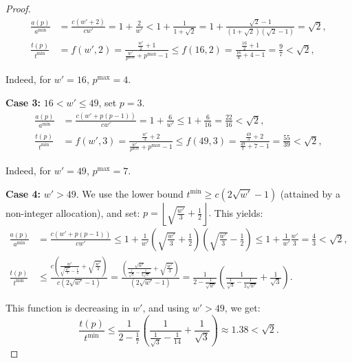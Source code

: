 \documentclass{article}
\begin{document}
\begin{proof}
\begin{align*}
\frac{a(p)}{a^{\min}} &=\frac{c(w'+2)}{cw'}=1+\frac{2}{w'} < 1+\frac{1}{1+\sqrt{2}}=1+\frac{\sqrt{2}-1}{(1+\sqrt{2})(\sqrt{2}-1)}=\sqrt{2}, \\[6pt]
\frac{t(p)}{t^{\min}}
      &= f(w',2)
       = \frac{\tfrac{w'}{2} + 1}{\tfrac{w'}{p^{\max}} + p^{\max} - 1}
       \le f(16,2)
       = \frac{\tfrac{16}{2} + 1}{\tfrac{16}{4} + 4 - 1}
       = \frac{9}{7}
       < \sqrt{2},
\end{align*}

Indeed, for \(w' = 16\), \(p^{\max}=4\).

\textbf{Case 3:} \(16 < w' \le 49\), set \(p = 3\).
\begin{align*}
\frac{a(p)}{a^{\min}}
      &= \frac{c\!\left(w' + p(p-1)\right)}{c w'}
       = 1 + \frac{6}{w'}
       \le 1 + \frac{6}{16}
       = \frac{22}{16}
       < \sqrt{2}, \\[6pt]
\frac{t(p)}{t^{\min}}
      &= f(w',3)
       = \frac{\tfrac{w'}{3} + 2}{\tfrac{w'}{p^{\max}} + p^{\max} - 1}
       \le f(49,3)
       = \frac{\tfrac{49}{3} + 2}{\tfrac{49}{7} + 7 - 1}
       = \frac{55}{39}
       < \sqrt{2},
\end{align*}

Indeed, for \(w' = 49\), \(p^{\max}=7\).


\textbf{Case 4:} \(w' > 49\).  
We use the lower bound \(t^{\min} \ge c(2\sqrt{w'} - 1)\) (attained by a non-integer allocation), and set:
\(
p = \left\lfloor \sqrt{\frac{w'}{3}} + \frac{1}{2} \right\rfloor.
\)
This yields:
\begin{align*}
\frac{a(p)}{a^{\min}}&=\frac{c(w'+p(p-1))}{cw'}\leq 1+\frac{1}{w'}\left( \sqrt{\frac{w'}{3}}+\frac{1}{2}\right)\left(\sqrt{\frac{w'}{3}}-\frac{1}{2}\right)\leq 1+\frac{1}{w'}\frac{w'}{3} = \frac{4}{3}<\sqrt{2}, \\[6pt]
\frac{t(p)}{t^{\min}} &\leq \frac{c\left(\frac{w'}{\sqrt{\frac{w'}{3}}-\frac{1}{2}} +\sqrt{\frac{w'}{3}}\right)}{c(2\sqrt{w'}-1)}= \frac{\left(\frac{\sqrt{w'}}{\frac{1}{\sqrt{3}}-\frac{1}{2\sqrt{w'}}} +\sqrt{\frac{w'}{3}}\right)}{(2\sqrt{w'}-1)}=\frac{1}{2-\frac{1}{\sqrt{w'}}}\left(\frac{1}{\frac{1}{\sqrt{3}}-\frac{1}{2\sqrt{w'}}} +\frac{1}{\sqrt{3}}\right).
\end{align*}

This function is decreasing in \(w'\), and using \(w' > 49\), we get:
\[
\frac{t(p)}{t^{\min}} \le \frac{1}{2 - \frac{1}{7}} \left( \frac{1}{\frac{1}{\sqrt{3}} - \frac{1}{14}} + \frac{1}{\sqrt{3}} \right) \approx 1.38 < \sqrt{2}.
\]



\end{proof}
\end{document}
